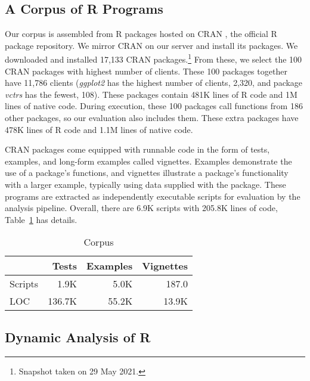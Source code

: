 \documentclass[10pt,sigplan,authorversion=true]{acmart}
\newcommand{\ggplot}{\textit{ggplot2}\xspace}
\newcommand{\vctrs}{\textit{vctrs}\xspace}
\begin{document}
\subsection{A Corpus of R Programs}

Our corpus is assembled from R packages hosted on CRAN \cite{ligges2017}, the
official R package repository. We mirror CRAN on our server and install its
packages. We downloaded and installed 17,133 CRAN packages.\footnote{Snapshot
taken on 29 May 2021.} From these, we select the 100 CRAN packages with highest
number of clients. These 100 packages together have 11,786 clients (\ggplot has
the highest number of clients, 2,320, and package \vctrs has the fewest, 108).
These packages contain 481K lines of R code and 1M lines of native code. During
execution, these 100 packages call functions from 186 other packages, so our
evaluation also includes them. These extra packages have 478K lines of R code
and 1.1M lines of native code.

CRAN packages come equipped with runnable code in the form of tests, examples,
and long-form examples called vignettes. Examples demonstrate the use of a
package's functions, and vignettes illustrate a package's functionality with a
larger example, typically using data supplied with the package. These programs
are extracted as independently executable scripts for evaluation by the analysis
pipeline. Overall, there are 6.9K scripts with 205.8K lines of code,
Table~\ref{table:corpus} has details.

\begin{table}[!h]   \small  \centering
  \caption{Corpus}\label{table:corpus}
  \vspace{-3mm}
  \begin{tabular}{lrrr}    \toprule
    &\bf Tests&\bf Examples&\bf Vignettes\\    \midrule
    {Scripts}&1.9K&5.0K&187.0\\    \midrule
    {LOC}&136.7K&55.2K&13.9K\\
    \bottomrule
  \end{tabular}
\end{table}

\subsection{Dynamic Analysis of R}
\end{document}
